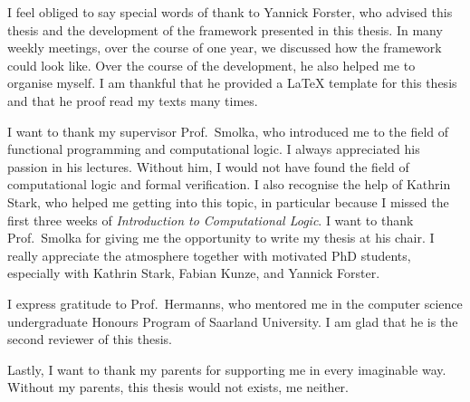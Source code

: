 I feel obliged to say special words of thank to Yannick Forster, who advised this thesis and the development of the framework presented in this
thesis.  In many weekly meetings, over the course of one year, we discussed how the framework could look like.  Over the course of the development, he
also helped me to organise myself.  I am thankful that he provided a {\LaTeX} template for this thesis and that he proof read my texts many times.

I want to thank my supervisor Prof.~Smolka, who introduced me to the field of functional programming and computational logic.  I always appreciated
his passion in his lectures.  Without him, I would not have found the field of computational logic and formal verification.  I also recognise the help
of Kathrin Stark, who helped me getting into this topic, in particular because I missed the first three weeks of \textit{Introduction to Computational
  Logic}.  I want to thank Prof.~Smolka for giving me the opportunity to write my thesis at his chair.  I really appreciate the atmosphere together
with motivated PhD students, especially with Kathrin Stark, Fabian Kunze, and Yannick Forster.

I express gratitude to Prof.~Hermanns, who mentored me in the computer science undergraduate Honours Program of Saarland University.  I am glad that
he is the second reviewer of this thesis.

Lastly, I want to thank my parents for supporting me in every imaginable way.  Without my parents, this thesis would not exists, me neither.


